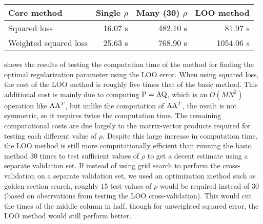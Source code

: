 \begin{table}
  \centering
  \begin{tabular}{lrrr}
    Core method           & Single $\rho$ & Many (30) $\rho$ & LOO method \\\hline
    Squared loss          & 16.07 s       & 482.10 s         & 81.97 s \\
    Weighted squared loss & 25.63 s       & 768.90 s         & 1054.06 s \\
  \end{tabular}
\end{table}

 shows the results of testing the computation time
of the \textcite{Rifkin2007} method
for finding the optimal regularization parameter using the LOO error.
When using squared loss, the cost of the LOO method is roughly five times
that of the basic method.
This additional cost is mainly due to computing $\mathrm{P} = \mathrm{A} \mathrm{Q}$,
which is an $O(MN^2)$ operation like $\mathrm{A} \mathrm{A}^T$,
but unlike the computation of $\mathrm{A} \mathrm{A}^T$,
the result is not symmetric, so it requires twice the computation time.
The remaining computational costs are due largely to the matrix-vector
products required for testing each different value of $\rho$.
Despite this large increase in computation time,
the LOO method is still more computationally efficient than
running the basic method 30 times to test sufficient values of $\rho$
to get a decent estimate using a separate validation set.
If instead of using grid search to perform the cross-validation
on a separate validation set,
we used an optimization method such as golden-section search,
roughly 15 test values of $\rho$ would be required instead of 30
(based on observations from testing the LOO cross-validation).
This would cut the times of the middle column in half,
though for unweighted squared error, the LOO method would still perform better.

